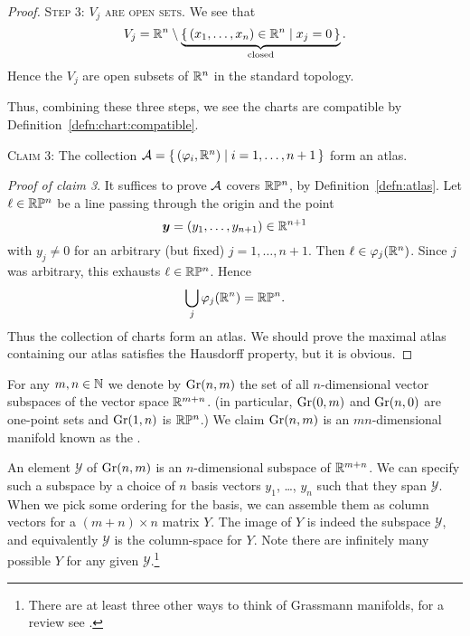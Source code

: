 \begin{proof}
\textsc{Step 3: $V_{j}$ are open sets.} We see that
\begin{equation}
V_{j} = \mathbb{R}^{n}\setminus\underbrace{\{\,(x_{1},\dots,x_{n})\in\mathbb{R}^{n}\mid
x_{j}=0\,\}}_{\text{closed}}.
\end{equation}
Hence the $V_{j}$ are open subsets of $\mathbb{R}^{n}$ in the standard
topology.

Thus, combining these three steps, we see the charts are compatible by Definition~\ref{defn:chart:compatible}.

\smallbreak
  \textsc{Claim 3:} The collection $\mathcal{A}=\{\,(\varphi_{i},\mathbb{R}^{n})\mid i=1,\dots,n+1\,\}$
form an atlas.

\noindent\textit{Proof of claim 3}. It suffices to prove $\mathcal{A}$
covers $\mathbb{R}\mathbb{P}^{n}$, by Definition~\ref{defn:atlas}. Let $\ell\in\mathbb{R}\mathbb{P}^{n}$
be a line passing through the origin and the point
\begin{equation}
\boldsymbol{y} = (y_{1},\dots,y_{n+1})\in\mathbb{R}^{n+1}
\end{equation}
with $y_{j}\neq0$ for an arbitrary (but fixed) $j=1,\dots,n+1$.
Then $\ell\in\varphi_{j}(\mathbb{R}^{n})$. Since $j$ was arbitrary, this
exhausts $\ell\in\mathbb{R}\mathbb{P}^{n}$. Hence
\begin{equation}
\bigcup_{j}\varphi_{j}(\mathbb{R}^{n})=\mathbb{R}\mathbb{P}^{n}.
\end{equation}
Thus the collection of charts form an atlas. We should prove the maximal
atlas containing our atlas
satisfies the Hausdorff property, but it is obvious.
\end{proof}

\begin{example}
For any $m,n\in\mathbb{N}$ we denote by $\operatorname{Gr}(n,m)$ the set of all
$n$-dimensional vector subspaces of the vector space $\mathbb{R}^{m+n}$.
(in particular, $\operatorname{Gr}(0,m)$ and $\operatorname{Gr}(n,0)$ are one-point
sets and $\operatorname{Gr}(1,n)$ is $\mathbb{R}\mathbb{P}^{n}$.) We claim $\operatorname{Gr}(n,m)$ is
an $mn$-dimensional manifold known as the .
\end{example}

An element $\mathcal{Y}$ of $\operatorname{Gr}(n,m)$ is an $n$-dimensional
subspace of $\mathbb{R}^{m+n}$. We can specify such a subspace by a choice of
$n$ basis vectors $y_{1}$, \dots, $y_{n}$ such that they span $\mathcal{Y}$.
When we pick some ordering for the basis, we can assemble them as column
vectors for a $(m+n)\times n$ matrix $Y$. The image of $Y$ is indeed
the subspace $\mathcal{Y}$, and equivalently $\mathcal{Y}$ is the
column-space for $Y$. Note there are infinitely many possible $Y$
for any given $\mathcal{Y}$.\footnote{There are at least three other
ways to think of Grassmann manifolds, for a review see
.}

